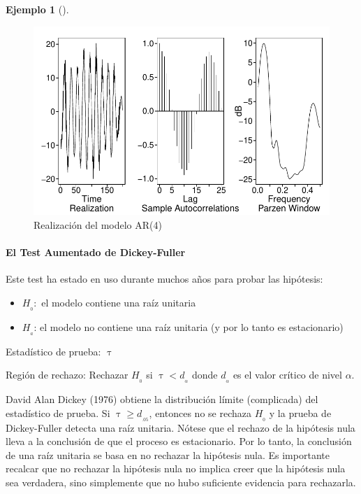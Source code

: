 \documentclass[
  us-letterpaper,
]{scrreprt}
\let\oldparagraph\paragraph
\renewcommand{\paragraph}[1]{\oldparagraph{#1}\mbox{}}
\theoremstyle{plain}
\theoremstyle{definition}
\newtheorem{example}{Ejemplo}[chapter]
\theoremstyle{plain}
\theoremstyle{definition}
\theoremstyle{remark}
\begin{document}
\begin{example}[]
\begin{tcolorbox}
\begin{figure}[H]
{\includegraphics{series_files/figure-pdf/fig-ejar4-1.pdf}

}

\caption{\label{fig-ejar4}Realización del modelo AR(4)}

\end{figure}%

\end{tcolorbox}

\end{example}

\paragraph{El Test Aumentado de
Dickey-Fuller}\label{el-test-aumentado-de-dickey-fuller}

Este test ha estado en uso durante muchos años para probar las
hipótesis:

\begin{itemize}
\item
  \(H_{_0}:\) el modelo contiene una raíz unitaria
\item
  \(H_{_a}\): el modelo no contiene una raíz unitaria (y por lo tanto es
  estacionario)
\end{itemize}

Estadístico de prueba: \(\uptau\)

Región de rechazo: Rechazar \(H_{_0}\) si \(\uptau < d_{_\alpha}\) donde
\(d_{_\alpha}\) es el valor crítico de nivel \(\alpha\).

David Alan Dickey (1976) obtiene la distribución límite (complicada) del
estadístico de prueba. Si \(\uptau \geq d_{_{.05}}\), entonces no se
rechaza \(H_{_0}\) y la prueba de Dickey-Fuller detecta una raíz
unitaria. Nótese que el rechazo de la hipótesis nula lleva a la
conclusión de que el proceso es estacionario. Por lo tanto, la
conclusión de una raíz unitaria se basa en no rechazar la hipótesis
nula. Es importante recalcar que no rechazar la hipótesis nula no
implica creer que la hipótesis nula sea verdadera, sino simplemente que
no hubo suficiente evidencia para rechazarla.
\end{document}
